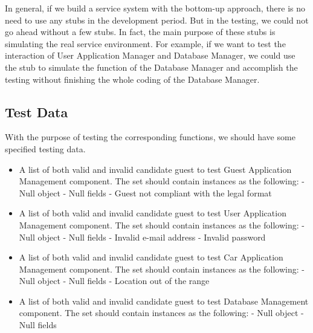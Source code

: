 \documentclass{article}
\begin{document}
In general, if we build a service system with the bottom-up approach, there is no need to use any stubs in the development period. But in the testing, we could not go ahead without a few stubs. 
\newline
In fact, the main purpose of these stubs is simulating the real service environment. For example, if we want to test the interaction of User Application Manager and Database Manager, we could use the stub to simulate the function of the Database Manager and accomplish the testing without finishing the whole coding of the Database Manager. 
\newline 

\subsection{Test Data}
With the purpose of testing the corresponding functions, we should have some specified testing data.
\begin{itemize}
	
	\item A list of both valid and invalid candidate guest to test Guest Application Management component. The set should contain instances as the following:
	\newline
	\newline - Null object
	\newline - Null fields
	\newline - Guest not compliant with the legal format
	
	\item A list of both valid and invalid candidate guest to test User Application Management component. The set should contain instances as the following:
	\newline
	\newline - Null object
	\newline - Null fields
	\newline - Invalid e-mail address
	\newline - Invalid password
	
	\item A list of both valid and invalid candidate guest to test Car Application Management component. The set should contain instances as the following:
	\newline
	\newline - Null object
	\newline - Null fields
	\newline - Location out of the range
	
	\item A list of both valid and invalid candidate guest to test Database Management component. The set should contain instances as the following:
	\newline
	\newline - Null object
	\newline - Null fields
	
\end{itemize}
\newpage
\end{document}
